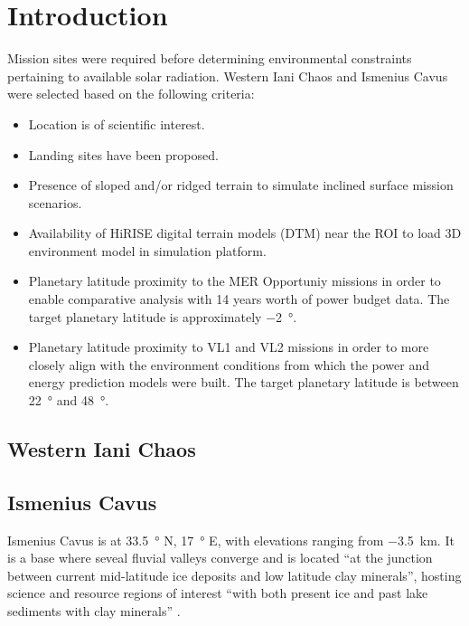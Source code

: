 \section{Introduction}
\label{sec:MissionSites:Introduction}
Mission sites were required before determining environmental constraints pertaining to available solar radiation. Western Iani Chaos and Ismenius Cavus were selected based on the following criteria:

\begin{itemize}
    \item Location is of scientific interest.
    \item Landing sites have been proposed.
    \item Presence of sloped and/or ridged terrain to simulate inclined surface mission scenarios.
    \item Availability of HiRISE digital terrain models (DTM) near the ROI to load 3D environment model in simulation platform.
    \item Planetary latitude proximity to the MER Opportuniy missions in order to enable comparative analysis with 14 years worth of power budget data. The target planetary latitude is approximately \SI{-2}{\degree}.
    \item Planetary latitude proximity to VL1 and VL2 missions in order to more closely align with the environment conditions from which the power and energy prediction models were built. The target planetary latitude is between \SI{22}{\degree} and \SI{48}{\degree}.
\end{itemize}

\subsection{Western Iani Chaos}
\label{sec:MissionSites:WesternIaniChaos}

\subsection{Ismenius Cavus}
\label{sec:MissionSites:IsmeniusCavus}
Ismenius Cavus is at \SI{33.5}{\degree} N, \SI{17}{\degree} E, with elevations ranging from \SI{-3.5}{\kilo\meter}. It is a base where seveal fluvial valleys converge and is located ``at the junction between current mid-latitude ice deposits and low latitude clay minerals'', hosting science and resource regions of interest ``with both present ice and past lake sediments with clay minerals''  .

